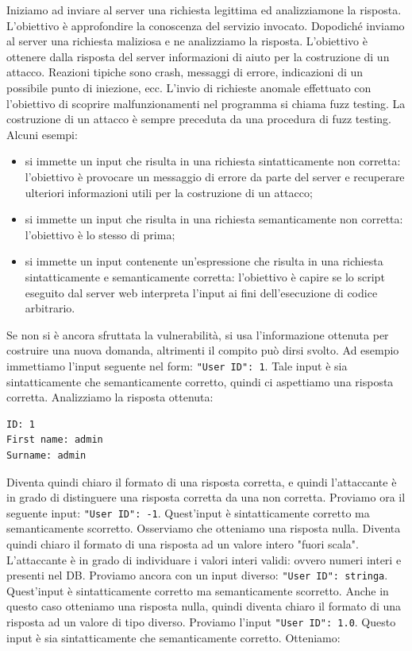 Iniziamo ad inviare al server una richiesta legittima ed analizziamone la risposta. L'obiettivo è approfondire la conoscenza del servizio invocato. Dopodiché inviamo al server una richiesta maliziosa e ne analizziamo la risposta. L'obiettivo è ottenere dalla risposta del server informazioni di aiuto per la costruzione di un attacco. Reazioni tipiche sono crash, messaggi di errore, indicazioni di un possibile punto di iniezione, ecc. L'invio di richieste anomale effettuato con l'obiettivo di scoprire malfunzionamenti nel programma si chiama fuzz testing. La costruzione di un attacco è sempre preceduta da una procedura di fuzz testing. Alcuni esempi:
\begin{itemize}
    \item si immette un input che risulta in una richiesta sintatticamente non corretta: l'obiettivo è provocare un messaggio di errore da parte del server e recuperare ulteriori informazioni utili per la costruzione di un attacco;
    \item si immette un input che risulta in una richiesta semanticamente non corretta: l'obiettivo è lo stesso di prima;
    \item si immette un input contenente un'espressione che risulta in una richiesta sintatticamente e semanticamente corretta: l'obiettivo è capire se lo script eseguito dal server web interpreta l'input ai fini dell'esecuzione di codice arbitrario.
\end{itemize}
Se non si è ancora sfruttata la vulnerabilità, si usa l'informazione ottenuta per costruire una nuova domanda, altrimenti il compito può dirsi svolto. Ad esempio immettiamo l'input seguente nel form: \texttt{"User ID": 1}. Tale input è sia sintatticamente che semanticamente corretto, quindi ci aspettiamo una risposta corretta. Analizziamo la risposta ottenuta:
\begin{lstlisting}
ID: 1
First name: admin
Surname: admin
\end{lstlisting}
Diventa quindi chiaro il formato di una risposta corretta, e quindi l'attaccante è in grado di distinguere una risposta corretta da una non corretta. Proviamo ora il seguente input: \texttt{"User ID": -1}. Quest'input è sintatticamente corretto ma semanticamente scorretto. Osserviamo che otteniamo una risposta nulla. Diventa quindi chiaro il formato di una risposta ad un valore intero "fuori scala". L'attaccante è in grado di individuare i valori interi validi: ovvero numeri interi e presenti nel DB. Proviamo ancora con un input diverso: \texttt{"User ID": stringa}. Quest'input è sintatticamente corretto ma semanticamente scorretto. Anche in questo caso otteniamo una risposta nulla, quindi diventa chiaro il formato di una risposta ad un valore di tipo diverso. Proviamo l'input \texttt{"User ID": 1.0}. Questo input è sia sintatticamente che semanticamente corretto. Otteniamo:

